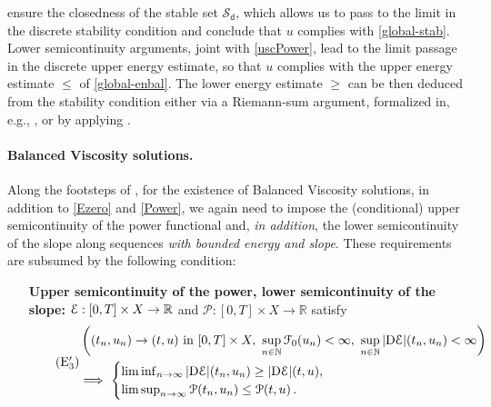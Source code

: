 \documentclass[a4paper,10pt,reqno]{amsart} %
\newcommand{\R}{\mathbb{R}}
\newcommand{\N}{\mathbb{N}}
\numberwithin{equation}{section}
\def\rmD{{\mathrm D}} \def\rmE{{\mathrm E}} \def\rmF{{\mathrm F}}
\newcommand{\Xs}{X}
\newcommand{\mdn}{\mathsf{d}}
\newcommand{\ene}[2]{\mathcal{E}(#1,#2)}
\newcommand{\perto}[1]{\mathcal{F}_0(#1)}
\newcommand{\pwn}{\mathcal{P}}
\newcommand{\pw}[2]{\mathcal{P}(#1,#2)}
\newcommand{\stab}[1]{\mathscr{S}_{#1}}
\newcommand{\slope}[3]{|\rmD {#1}|(#2,#3)}
\newcommand{\RRR}{\color{red}}
\begin{document}
  ensure the closedness of the stable set $\stab \mdn$, which
  allows us to pass to the limit in the discrete stability condition and conclude that $u$ complies with  \eqref{global-stab}. Lower semicontinuity arguments, joint with \eqref{uscPower}, lead to the limit passage in the discrete upper energy estimate, so that $u$ complies with the  upper energy estimate  $\leq$  of  \eqref{global-enbal}. The lower energy estimate $\geq$ can be then deduced from the stability condition either via a Riemann-sum argument, formalized in, e.g.,    \cite[Prop,\ 2.1.23]{MieRouBOOK}, or by applying \cite[Lemma 6.2]{SavMin16}. 
\paragraph{\bf Balanced Viscosity solutions.} 
Along the footsteps of 
\cite[Thm.\ 4.2]{MRS-MJM}, 
 for the existence of Balanced Viscosity solutions, in addition to  \eqref{Ezero} and \eqref{Power},  we again need to impose the (conditional) upper semicontinuity of the power functional and, \emph{in addition}, the 
 lower semicontinuity of the slope
 along sequences \emph{with bounded energy and  slope}.
  These requirements are subsumed by the following condition:
\begin{itemize}
\item[\textbf{Upper semicontinuity of the power, lower semicontinuity of the slope:}] %
$\calE :[0,T]\times \Xs \to \R$ and
$\pwn :[0,T]\times \Xs \to \R$ satisfy
\begin{equation}
\label{uscPower-bis}
\tag{$\mathrm{E}_3'$}
\begin{aligned}
&
\left( (t_n,u_n)\to(t,u) \text{ in } [0,T]\times \Xs, \ 
\sup_{n\in\N} \perto{u_n}<\infty, \ \sup_{n\in \N} \slope \calE{t_n}{u_n}<\infty
 \right) 
\\
&  \Longrightarrow \ \begin{cases}
\liminf_{n\to\infty} \slope \calE{t_n}{u_n} \geq \slope \calE{t}{u},
\\
 \limsup_{n\to\infty} \pw {t_n}{u_n}\leq \pw tu\,.
 \end{cases}
 \end{aligned}
 \end{equation}
\end{itemize}
\end{document}
